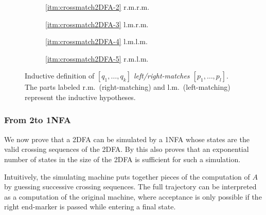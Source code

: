 \begin{figure}
	\centering
	\begin{subfigure}{0.246\textwidth}
		\centering
		
		\caption*{\ref{itm:crossmatch2DFA-2} r.m.\tto r.m.}
	\end{subfigure}
	\hfill
	\begin{subfigure}{0.242\textwidth}
		\centering
		
		\caption*{\ref{itm:crossmatch2DFA-3} l.m.\tto r.m.}
	\end{subfigure}
	\hfill
	\begin{subfigure}{0.242\textwidth}
		\centering
		
		\caption*{\ref{itm:crossmatch2DFA-4} l.m.\tto l.m.}
	\end{subfigure}
	\hfill
	\begin{subfigure}{0.246\textwidth}
		\centering
		
		\caption*{\ref{itm:crossmatch2DFA-5} r.m.\tto l.m.}
	\end{subfigure}
	\caption{Inductive definition of \emph{$[q_1,\dots,q_k]$ left/right-matches $[p_1,\dots,p_l]$}. The parts labeled r.m.\ (right-matching) and l.m.\ (left-matching) represent the inductive hypotheses.}
	\label{fig:2DFA-crossmatch}
\end{figure}

\subsubsection{From 2\DFAs to 1NFA}
We now prove that a 2DFA can be simulated by a 1NFA whose states are the valid crossing sequences of the 2DFA.
By  this also proves that an exponential number of states in the size of the 2DFA is sufficient for such a simulation.

Intuitively, the simulating machine puts together pieces of the computation of $A$ by guessing successive crossing sequences.
The full trajectory can be interpreted as a computation of the original machine, where acceptance is only possible if the right end-marker is passed while entering a final state.

